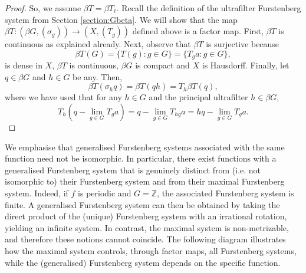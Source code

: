 \documentclass{amsart}
\numberwithin{equation}{section}
\theoremstyle{definition}
\theoremstyle{plain}
\begin{document}
\begin{proof}
So, we assume $\beta T=\beta T_{\ell}$. Recall the
definition of the ultrafilter Furstenberg system from 
Section \ref{section:Gbeta}. We will show that the map 
$\beta T: (\beta G, (\sigma_g))\to (X,(T_g))$ defined above is a factor map. First, $\beta T$ is continuous as explained already. Next, observe that $\beta T$ is surjective because 
$$\beta T(G)=\{T(g):g\in G\}=\{T_ga:g\in G\},$$ 
is dense in $X$, $\beta T$ is continuous, $\beta G$ is compact and $X$ is 
Hausdorff. Finally, let $q\in \beta G$ and $h\in G$ be any. Then,
$$\beta T(\sigma_hq)=\beta T(qh)=T_h\beta T(q),$$
where we have used that for any $h\in G$ and the principal ultrafilter $h\in \beta G$, 
$$T_h \left(q-\lim_{g\in G} T_ga\right)=q-\lim_{g\in G} T_{hg}a=hq-\lim_{g\in G} T_ga.$$ 
\end{proof}
We emphasise that generalised Furstenberg systems associated with the same function
need not be isomorphic. In particular, there exist 
functions with a generalised Furstenberg system that is 
genuinely distinct from (i.e. not isomorphic to) their 
Furstenberg system and from their maximal Furstenberg 
system. 
Indeed, if $f$ is periodic and $G = \mathbb{Z}$, the associated Furstenberg system
is finite. A generalised Furstenberg system can then be obtained by taking the
direct product of the (unique) Furstenberg system with an irrational rotation,
yielding an infinite system. In contrast, the maximal system is non-metrizable,
and therefore these notions cannot coincide. The following diagram illustrates how the maximal system controls, through factor maps,
all Furstenberg systems, while the (generalised) Furstenberg system depends on the
specific function.
\begin{center}
    
\end{center}
\end{document}

